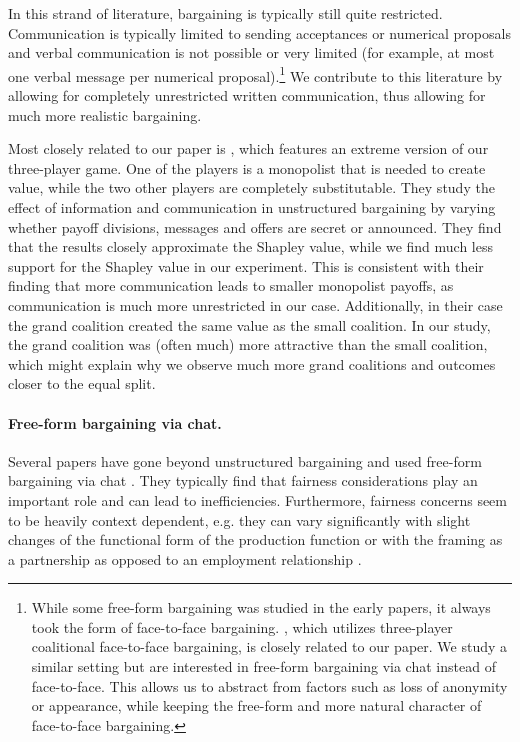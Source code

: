 In this strand of literature, bargaining is typically still quite restricted. Communication is typically limited to sending acceptances or numerical proposals and verbal communication is not possible or very limited (for example, at most one verbal message per numerical proposal).\footnote{While some free-form bargaining was studied in the early papers, it always took the form of face-to-face bargaining. \textcite{LeopoldWildburger1992}, which utilizes three-player coalitional face-to-face bargaining, is closely related to our paper. We study a similar setting but are interested in free-form bargaining via chat instead of face-to-face. This allows us to abstract from factors such as loss of anonymity or appearance, while keeping the free-form and more natural character of face-to-face bargaining.} We contribute to this literature by allowing for completely unrestricted written communication, thus allowing for much more realistic bargaining. 

Most closely related to our paper is \textcite{MurnighanRoth1977}, which features an extreme version of our three-player game. One of the players is a monopolist that is needed to create value, while the two other players are completely substitutable. They study the effect of information and communication in unstructured bargaining by varying whether payoff divisions, messages and offers are secret or announced. They find that the results closely approximate the Shapley value, while we find much less support for the Shapley value in our experiment. This is consistent with their finding that more communication leads to smaller monopolist payoffs, as communication is much more unrestricted in our case. Additionally, in their case the grand coalition created the same value as the small coalition. In our study, the grand coalition was (often much) more attractive than the small coalition, which might explain why we observe much more grand coalitions and outcomes closer to the equal split.


\paragraph{Free-form bargaining via chat.}

Several papers have gone beyond unstructured bargaining and used free-form bargaining via chat \parencite{LuhanPoulsenRoos2019, Galeottietal2018, HossainLyonsSiow2020, NavarroVeszteg2020, ShinodaFunaki2022, Schwaninger2022, Takeuchietal2022}. They typically find that fairness considerations play an important role and can lead to inefficiencies. Furthermore, fairness concerns seem to be heavily context dependent, e.g. they can vary significantly with slight changes of the functional form of the production function \parencite[]{Takeuchietal2022} or with the framing as a partnership as opposed to an employment relationship \parencite{HossainLyonsSiow2020}.

